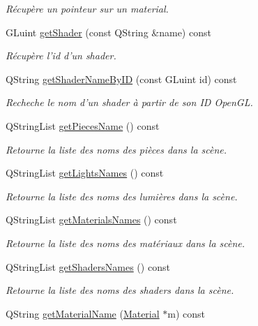 \begin{DoxyCompactItemize}
\begin{DoxyCompactList}\small\item\em Récupère un pointeur sur un material. \end{DoxyCompactList}\item 
G\+Luint \hyperlink{class_scene_a957a47245453a8868a417396abf9adce}{get\+Shader} (const Q\+String \&name) const 
\begin{DoxyCompactList}\small\item\em Récupère l'id d'un shader. \end{DoxyCompactList}\item 
Q\+String \hyperlink{class_scene_af00f7d191f9277b3dbad125c54677d79}{get\+Shader\+Name\+By\+I\+D} (const G\+Luint id) const 
\begin{DoxyCompactList}\small\item\em Recheche le nom d'un shader à partir de son I\+D Open\+G\+L. \end{DoxyCompactList}\item 
Q\+String\+List \hyperlink{class_scene_a2ea5207a5d9ec6e4081f12896b01d9d5}{get\+Pieces\+Name} () const 
\begin{DoxyCompactList}\small\item\em Retourne la liste des noms des pièces dans la scène. \end{DoxyCompactList}\item 
Q\+String\+List \hyperlink{class_scene_a215d616b6132f30a6bfc66ea4a3cfb95}{get\+Lights\+Names} () const 
\begin{DoxyCompactList}\small\item\em Retourne la liste des noms des lumières dans la scène. \end{DoxyCompactList}\item 
Q\+String\+List \hyperlink{class_scene_a481bf791889936bf3521c849bc4c7c2f}{get\+Materials\+Names} () const 
\begin{DoxyCompactList}\small\item\em Retourne la liste des noms des matériaux dans la scène. \end{DoxyCompactList}\item 
Q\+String\+List \hyperlink{class_scene_ae8045c3444b367c070988b30d69e5a36}{get\+Shaders\+Names} () const 
\begin{DoxyCompactList}\small\item\em Retourne la liste des noms des shaders dans la scène. \end{DoxyCompactList}\item 
Q\+String \hyperlink{class_scene_accd8407f070358c3d6744994df93a92d}{get\+Material\+Name} (\hyperlink{class_material}{Material} $\ast$m) const 

\end{DoxyCompactItemize}
